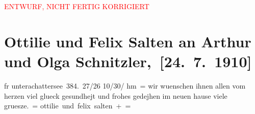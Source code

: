 
\begin{center}
            \textcolor{red}{ENTWURF, NICHT FERTIG KORRIGIERT}
                      \end{center}
            
         
         \renewcommand{\erwaehntePersonen}{Personen: Felix Salten, Ottilie Salten, Olga Schnitzler}
         \renewcommand{\erwaehnteOrte}{Orte: Sternwartestraße 71, Unterach am Attersee, Wien}
         \renewcommand{\erwaehnteWerke}{}
               \section[ Ottilie und Felix Salten an Arthur und Olga Schnitzler, {[}24. 7. 1910{]}]{ Ottilie und Felix Salten an Arthur und Olga
               Schnitzler, {[}24. 7. 1910{]}}\nopagebreak{}\rehead{ }\begin{ledgroupsized}[t]{13cm}\normalsize\beginnumbering \toendnotes[C]{\smallbreak\pagebreak[2]} 
\toendnotes[C]{\smallbreak}\pstart
           \noindent{}\centering{}{\pb}fr unterachattersee 384. 27/26 10/30/ hm =\pend
           \pstart
           wir wuenschen ihnen allen vom herzen viel glueck gesundhejt und frohes gedejhen im
               neuen hause viele
               gruesze. =\pend
           \pstart
           \spacefill\mbox{ottilie und felix salten + =}\pend
           
         
         \endnumbering{}\end{ledgroupsized}  \newcommand{\dateiname}{L03550}\newcommand{\titel}{Ottilie und Felix Salten an Arthur und Olga Schnitzler, [24. 7. 1910]}\newcommand{\editorInnen}{Martin Anton Müller und Laura Untner}
      